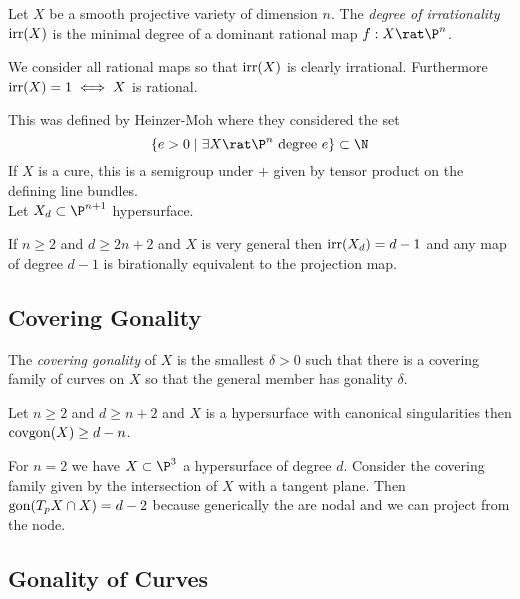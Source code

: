 \documentclass[12pt]{article}
\begin{document}
\begin{defn}
Let $X$ be a smooth projective variety of dimension $n$. The \textit{degree of irrationality} $\mathrm{irr}(X)$ is the minimal degree of a dominant rational map $f : X \rat \P^n$. 
\end{defn}

\begin{rmk}
We consider all rational maps so that $\mathrm{irr}(X)$ is clearly irrational. Furthermore $\mathrm{irr}(X) = 1 \iff X$ is rational. 
\end{rmk}

This was defined by Heinzer-Moh where they considered the set
\[ \{ e > 0 \mid \exists X \rat \P^n \text{ degree } e \}  \subset \N \]
If $X$ is a cure, this is a semigroup under $+$ given by tensor product on the defining line bundles. 
\bigskip\\
Let $X_d \subset \P^{n+1}$ hypersurface.

\begin{theorem}
If $n \ge 2$ and $d \ge 2 n + 2$ and $X$ is very general then $\mathrm{irr}(X_d) = d - 1$ and any map of degree $d-1$ is birationally equivalent to the projection map. 
\end{theorem}

\subsection{Covering Gonality}

\begin{defn}
The \textit{covering gonality} of $X$ is the smallest $\delta > 0$ such that there is a covering family of curves on $X$ so that the general member has gonality $\delta$. 
\end{defn}

\begin{theorem}[LP,BdPELU]
Let $n \ge 2$ and $d \ge n + 2$ and $X$ is a hypersurface with canonical singularities then $\mathrm{covgon}(X) \ge d - n$. 
\end{theorem}

\begin{example}
For $n = 2$ we have $X \subset \P^3$ a hypersurface of degree $d$. Consider the covering family given by the intersection of $X$ with a tangent plane. Then $\mathrm{gon}(T_p X \cap X) =  d - 2$ because generically the are nodal and we can project from the node. 
\end{example}

\subsection{Gonality of Curves}
\end{document}
